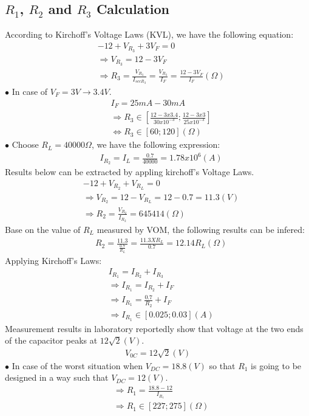 \documentclass[12pt]{extarticle}
\newcommand{\<}{\langle}
\renewcommand{\>}{\rangle}
\theoremstyle{definition}
\begin{document}
\subsection{$R_1$, $R_2$ and $R_3$ Calculation}
\begin{normalsize}
According to Kirchoff's Voltage Laws (KVL), we have the following equation:
\begin{align*}
&-12 + V_{R_3} + 3V_F = 0\\
&\Longrightarrow V_{R_3} = 12 - 3V_F\\
&\Longrightarrow R_3 = \frac{V_{R_3}}{I_{sccR_3}} = \frac{V_{R_3}}{I_F} = \frac{12 - 3V_F}{I_F}(\Omega)
\end{align*}
$\bullet$ In case of $V_F  = 3V \longrightarrow 3.4V$.
\begin{align*}
&I_F = 25mA - 30mA\\
&\Longrightarrow R_3 \in \left[\frac{12 - 3x3.4}{30x10^{-3}} ; \frac{12 - 3x3}{25x10^{-3}}\right]\\
&\iff R_3 \in [60 ; 120] (\Omega)
\end{align*}
$\bullet$ Choose $R_L = 40000\Omega$, we have the following expression:
\begin{align*}
&I_{R_2} = I_L = \frac{0.7}{40000} = 1.78x10^6(A)
\end{align*}
Results below can be extracted by appling kirchoff's Voltage Laws. 
\begin{align*}
&-12 + V_{R_2} + V_{R_L} = 0\\
&\Longrightarrow V_{R_2} = 12 - V_{R_L} = 12 - 0.7 = 11.3(V)\\
&\Longrightarrow R_2 = \frac{V_{R_2}}{I_{R_2}} = 645414 (\Omega)
\end{align*}
Base on the value of $R_L$ measured by VOM, the following results can be infered:
\begin{align*}
&R_2 = \frac{11.3}{\frac{0.7}{R_L}} = \frac{11.3 X R_L}{0.7} = 12.14R_L (\Omega)
\end{align*}
Applying Kirchoff's Laws:
\begin{align*}
&I_{R_1} = I_{R_2} + I_{R_3}\\
&\Longrightarrow I_{R_1} = I_{R_2} + I_F\\
&\Longrightarrow I_{R_1} = \frac{0.7}{R_2} + I_F\\
&\Longrightarrow I_{R_1} \in [0.025 ; 0.03] (A)
\end{align*}
Measurement results in laboratory reportedly show that voltage at the two ends of the capacitor peaks at $12\sqrt{2} (V)$.
\begin{align*}
V_{0C} = 12\sqrt{2} (V)
\end{align*}
$\bullet$ In case of the worst situation when $V_{DC} = 18.8(V)$ so that $R_1$ is going to be designed in a way such that $V_{DC} = 12 (V)$.
\begin{align*}
&\Longrightarrow R_1 = \frac{18.8 - 12}{I_{R_1}}\\
&\Longrightarrow R_1 \in [227 ; 275](\Omega)
\end{align*}

\end{normalsize}
\end{document}
